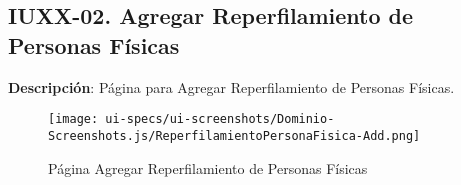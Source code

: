 \subsection{IUXX-02. Agregar Reperfilamiento de Personas F\'isicas} \label{sec:ui-page-create-reperfilamientopersonafisica}

\textbf{Descripci\'on}: P\'agina para Agregar Reperfilamiento de Personas F\'isicas.\\

\begin{figure}[H]
	\label{tab:ui-create-reperfilamientopersonafisica-page}
	\texttt{[image: ui-specs/ui-screenshots/Dominio-Screenshots.js/ReperfilamientoPersonaFisica-Add.png]}
	\caption{P\'agina Agregar Reperfilamiento de Personas F\'isicas}
\end{figure}

